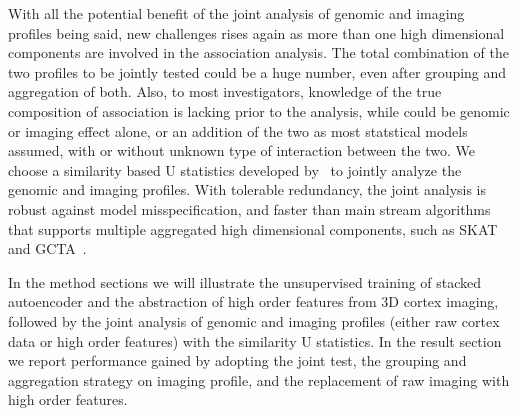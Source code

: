 With all the potential benefit of the joint analysis of genomic and imaging profiles being said, new challenges rises again as more than one high dimensional components are involved in the association analysis. The total combination of the two profiles to be jointly tested could be a huge number, even after grouping and aggregation of both. Also, to most investigators, knowledge of the true composition of association is lacking prior to the analysis, while could be genomic or imaging effect alone, or an addition of the two as most statstical models assumed, with or without unknown type of interaction between the two. We choose a similarity based U statistics developed by~\cite{UST1, UST2} to jointly analyze the genomic and imaging profiles. With tolerable redundancy, the joint analysis is robust against model misspecification, and faster than main stream algorithms that supports multiple aggregated high dimensional components, such as SKAT~\cite{SKAT} and GCTA~\cite{GCTA}.

In the method sections we will illustrate the unsupervised training of stacked autoencoder and the abstraction of high order features from 3D cortex imaging, followed by the joint analysis of genomic and imaging profiles (either raw cortex data or high order features) with the similarity U statistics. In the result section we report performance gained by adopting the joint test, the grouping and aggregation strategy on imaging profile, and the replacement of raw imaging with high order features.
